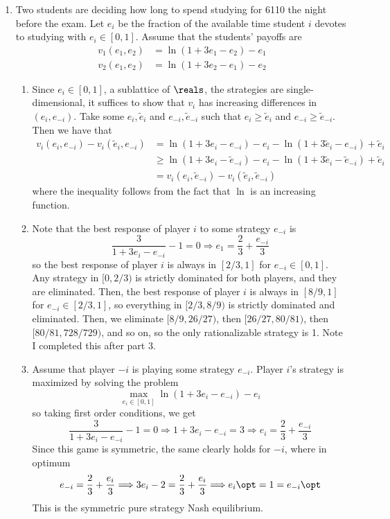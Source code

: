 \documentclass[10pt]{article}
\begin{document}
\begin{enumerate}
	\item Two students are deciding how long to spend studying for 6110 the night before the exam. Let $e_i$ be the fraction of the available time student $i$ devotes to studying with $e_i\in[0,1]$. Assume that the students' payoffs are \begin{align*} v_1(e_1,e_2) &= \ln(1 + 3e_1 - e_2) - e_1 \\ v_2(e_1,e_2) &= \ln(1 + 3e_2-e_1) - e_2\end{align*} \begin{enumerate} \item Since $e_i \in [0,1]$, a sublattice of $\reals$, the strategies are single-dimensional, it suffices to show that $v_i$ has increasing differences in $(e_i,e_{-i})$. Take some $e_i,\tilde{e}_i$ and $e_{-i},\tilde{e}_{-i}$ such that $e_i \ge \tilde{e}_i$ and $e_{-i} \ge \tilde{e}_{-i}$. Then we have that \begin{align*} v_i(e_i,e_{-i}) - v_i(\tilde{e}_i,e_{-i}) &= \ln(1 + 3e_i - e_{-i}) - e_i - \ln(1 + 3\tilde{e}_i - e_{-i}) + \tilde{e}_i \\ &\ge  \ln(1 + 3e_i - \tilde{e}_{-i}) - e_i - \ln(1 + 3\tilde{e}_i - \tilde{e}_{-i}) + \tilde{e}_i \\&= v_i(e_i,\tilde{e}_{-i}) - v_i(\tilde{e}_i,\tilde{e}_{-i})\end{align*}where the inequality follows from the fact that $\ln$ is an increasing function. \item Note that the best response of player $i$ to some strategy $e_{-i}$ is \[\frac{3}{1+3e_i - e_{-i}} - 1 = 0 \Longrightarrow e_1 = \frac{2}{3} + \frac{e_{-i}}{3}\]so the best response of player $i$ is always in $[2/3,1]$ for $e_{-i} \in [0,1]$. Any strategy in $[0,2/3)$ is strictly dominated for both players, and they are eliminated. Then, the best response of player $i$ is always in $[8/9,1]$ for $e_{-i} \in [2/3,1]$, so everything in $[2/3,8/9)$ is strictly dominated and eliminated. Then, we eliminate $[8/9,26/27)$, then $[26/27,80/81)$, then $[80/81,728/729)$, and so on, so the only rationalizable strategy is 1. Note I completed this after part 3. \item Assume that player $-i$ is playing some strategy $e_{-i}$. Player $i$'s strategy is maximized by solving the problem \[\max_{e_i \in [0,1]} \ln(1 + 3e_i - e_{-i}) - e_{i}\]so taking first order conditions, we get\[\frac{3}{1 + 3e_i - e_{-i}} - 1 = 0 \Longrightarrow 1 + 3e_i - e_{-i} = 3 \Longrightarrow e_i = \frac{2}{3} + \frac{e_{-i}}{3}\]Since this game is symmetric, the same clearly holds for $-i$, where in optimum \[e_{-i} = \frac{2}{3} + \frac{e_i}{3} \Longrightarrow 3e_i - 2 = \frac{2}{3} + \frac{e_i}{3} \Longrightarrow e_i\opt = 1 = e_{-i}\opt\]This is the symmetric pure strategy Nash equilibrium.  \end{enumerate}
\end{enumerate}
\end{document}
